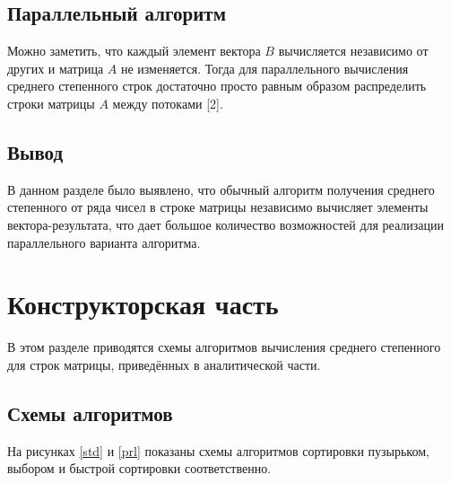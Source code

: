 \documentclass[12pt]{report}
\begin{document}
\section{Параллельный алгоритм}

Можно заметить, что каждый элемент вектора $B$ вычисляется независимо от других и матрица $A$ не изменяется. Тогда для параллельного вычисления среднего степенного строк достаточно просто равным образом распределить строки матрицы $A$ между потоками [2].

\section{Вывод}

В данном разделе было выявлено, что обычный алгоритм получения среднего степенного от ряда чисел в строке матрицы независимо вычисляет элементы вектора-результата, что дает большое количество возможностей для реализации параллельного варианта алгоритма.

\newpage

\chapter{Конструкторская часть}

В этом разделе приводятся схемы алгоритмов вычисления среднего степенного для строк матрицы, приведённых в аналитической части. 

\section{Схемы алгоритмов}

На рисунках \ref{std} и \ref{prl} показаны схемы алгоритмов сортировки пузырьком, выбором и быстрой сортировки соответственно.
\end{document}
